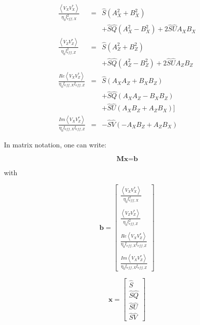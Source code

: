 \documentclass[a4paper,11pt]{report}
\begin{document}
\begin{eqnarray}
\frac{\left\langle V_X V_X^{*} \right\rangle }{\eta_0 l_{eff,X}^2}&=& \hat{S}(A^2_X+ B^2_X) \\
&&+\hat{S}\hat{Q}(A^2_X- B^2_X)+ 2 \hat{S}\hat{U}A_X B_X   \nonumber \\
\frac{\left\langle V_Z V_Z^{*} \right\rangle }{\eta_0 l_{eff,Z}^2}&=& \hat{S}(A^2_Z + B^2_Z) \\
&&+\hat{S}\hat{Q}(A^2_Z - B^2_Z)+ 2 \hat{S}\hat{U}A_Z B_Z   \nonumber \\
\frac{Re \left\langle V_X V_Z^{*}\right\rangle }{\eta_0 l_{eff,X} l_{eff,Z}}&=& \hat{S}(A_X A_Z +  B_X B_Z) \\
&&+ \hat{S}\hat{Q}(A_X A_Z -B_X B_Z)  \nonumber\\
&&+ \hat{S}\hat{U} (A_X B_Z + A_Z B_X)] \nonumber \\
\frac{Im \left\langle V_X V_Z^{*}\right\rangle }{\eta_0 l_{eff,X} l_{eff,Z}}&=& -\hat{S} \hat{V}(-A_X B_Z + A_Z B_X )
\end{eqnarray}

In matrix notation, one can write:

\begin{equation}\label{lineare_gleichung}
\textbf{M}\textbf{x}=\textbf{b}
\end{equation}


with

\begin{equation}
\textbf{b}=\left[ \begin{array}{c}
\frac{\left\langle V_X V_X^{*} \right\rangle }{\eta_0 l_{eff,X}^2} \\ \\
 \frac{\left\langle V_Z V_Z^{*} \right\rangle }{\eta_0 l_{eff,Z}^2}\\ \\
\frac{Re \left\langle V_X V_Z^{*}\right\rangle }{\eta_0 l_{eff,X} l_{eff,Z}} \\ \\
\frac{Im \left\langle V_X V_Z^{*}\right\rangle }{\eta_0 l_{eff,X} l_{eff,Z}}
\end{array}  \right]
\end{equation}

\begin{equation}
\textbf{x}=\left[ \begin{array}{c}
\hat{S}\\
\hat{S}\hat{Q}\\
\hat{S}\hat{U}\\
\hat{S}\hat{V}
\end{array}  \right]
\end{equation}
\end{document}

